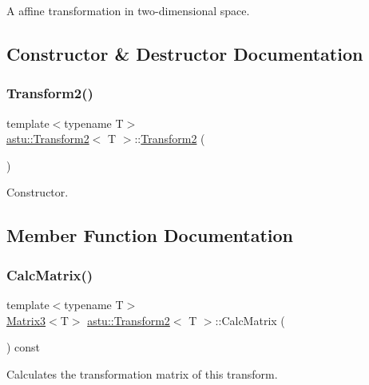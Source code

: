 A affine transformation in two-\/dimensional space. 

\subsection{Constructor \& Destructor Documentation}
\mbox{\label{classastu_1_1Transform2_ac4f230cba8e6862ab3348ea19305ef52}} 
\subsubsection{\texorpdfstring{Transform2()}{Transform2()}}
{\footnotesize\ttfamily template$<$typename T$>$ \\
\hyperlink{classastu_1_1Transform2}{astu\+::\+Transform2}$<$ T $>$\+::\hyperlink{classastu_1_1Transform2}{Transform2} (\begin{DoxyParamCaption}{ }\end{DoxyParamCaption})\hspace{0.3cm}{\ttfamily [inline]}}

Constructor. 

\subsection{Member Function Documentation}
\mbox{\label{classastu_1_1Transform2_a7fabb3752ecd13f0e83f9e0218dc4295}} 
\subsubsection{\texorpdfstring{Calc\+Matrix()}{CalcMatrix()}}
{\footnotesize\ttfamily template$<$typename T$>$ \\
\hyperlink{classastu_1_1Matrix3}{Matrix3}$<$T$>$ \hyperlink{classastu_1_1Transform2}{astu\+::\+Transform2}$<$ T $>$\+::Calc\+Matrix (\begin{DoxyParamCaption}{ }\end{DoxyParamCaption}) const\hspace{0.3cm}{\ttfamily [inline]}}

Calculates the transformation matrix of this transform.

